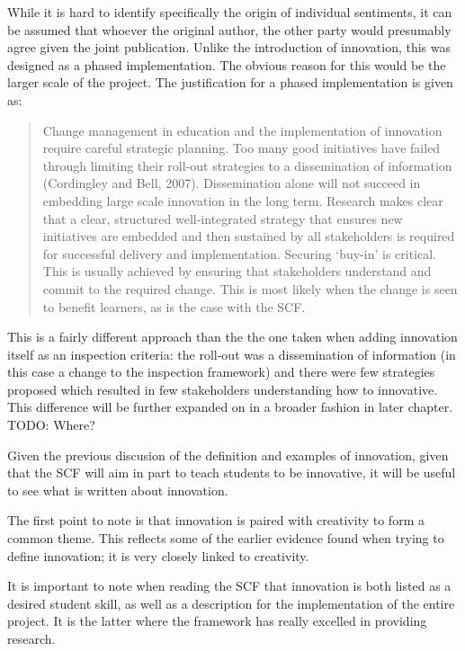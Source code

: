 While it is hard to identify specifically the origin of individual sentiments, it can be assumed that whoever the original author, the other party would presumably agree given the joint publication. Unlike the introduction of innovation, this was designed as a phased implementation. The obvious reason for this would be the larger scale of the project. The justification for a phased implementation is given as:

\begin{quote}
Change management in education and the implementation of innovation require careful strategic planning. Too many good initiatives have failed through limiting their roll-out strategies to a dissemination of information (Cordingley and Bell, 2007). Dissemination alone will not succeed in embedding large scale innovation in the long term. Research makes clear that a clear, structured well-integrated strategy that ensures new initiatives are embedded and then sustained by all stakeholders is required for successful delivery and implementation. Securing ‘buy-in’ is critical. This is usually achieved by ensuring that stakeholders understand and commit to the required change. This is most likely when the change is seen to benefit learners, as is the case with the SCF.
\end{quote}

This is a fairly different approach than the the one taken when adding innovation itself as an inspection criteria: the roll-out was a dissemination of information (in this case a change to the inspection framework) and there were few strategies proposed which resulted in few stakeholders understanding how to innovative. This difference will be further expanded on in a broader fashion in later chapter. TODO: Where?

Given the previous discusion of the definition and examples of innovation, given that the SCF will aim in part to teach students to be innovative, it will be useful to see what is written about innovation.

The first point to note is that innovation is paired with creativity to form a common theme. This reflects some of the earlier evidence found when trying to define innovation; it is very closely linked to creativity.

It is important to note when reading the SCF that innovation is both listed as a desired student skill, as well as a description for the implementation of the entire project. It is the latter where the framework has really excelled in providing research.

